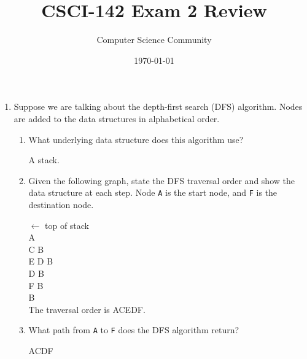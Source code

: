 \documentclass[11pt]{article}
\title{CSCI-142 Exam 2 Review}
\author{Computer Science Community}
\date{\today}
\newenvironment{answer}{\large\lstset{basicstyle=\tiny\ttfamily}\color{white} }{}
\newenvironment{answer}{\large\lstset{basicstyle=\large\ttfamily}\color{red} }{}
\begin{document}
\header
\begin{enumerate}


\item Suppose we are talking about the depth-first search (DFS) algorithm.  Nodes are added to the data structures in alphabetical order.
\begin{enumerate}
\item What underlying data structure does this algorithm use?

\begin{answer}
A stack.
\end{answer}

\item %
Given the following graph, state the DFS traversal order and show the data structure at each step.
Node \texttt{A} is the start node, and \texttt{F} is the destination node.

\begin{minipage}{0.35\textwidth}
\vspace{-136pt}
\begin{answer}
$\leftarrow$ top of stack \\
A \\
C B \\
E D B \\
D B \\
F B \\
B \\

The traversal order is ACEDF.
\end{answer}
\end{minipage}

\item %
What path from \texttt{A} to \texttt{F} does the DFS algorithm return?

\begin{answer}
ACDF 
\end{answer}


\end{enumerate}
\end{enumerate}
\end{document}
